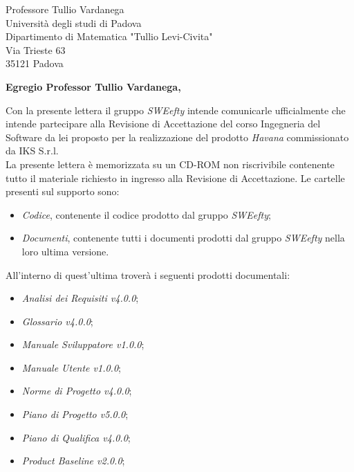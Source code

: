 \documentclass[12pt]{letter} %
\begin{document}
\begin{letter}{Professore Tullio Vardanega \\ Università degli studi di Padova \\ Dipartimento di Matematica "Tullio Levi-Civita" \\ Via Trieste 63 \\ 35121 Padova}
\opening{\textbf{Egregio Professor Tullio Vardanega,}}
\begin{addmargin}[2em]{2em}
  \hspace{1cm} Con la presente lettera il gruppo \emph{SWEefty} intende comunicarle ufficialmente che intende partecipare alla Revisione di Accettazione del corso Ingegneria del Software da lei proposto per la realizzazione del prodotto \emph{Havana} commissionato da IKS S.r.l.\\
  La presente lettera è memorizzata su un CD-ROM non riscrivibile contenente tutto il materiale richiesto in ingresso alla Revisione di Accettazione. Le cartelle presenti sul supporto sono:
  	\begin{itemize}
		\item \emph{Codice}, contenente il codice prodotto dal gruppo \emph{SWEefty};
		\item \emph{Documenti}, contenente tutti i documenti prodotti dal gruppo \emph{SWEefty} nella loro ultima versione.
	\end{itemize}
  All'interno di quest'ultima troverà i seguenti prodotti documentali:
      \begin{itemize}
      \item \emph{Analisi dei Requisiti v4.0.0};
      \item \emph{Glossario v4.0.0};
      \item \emph{Manuale Sviluppatore v1.0.0};
      \item \emph{Manuale Utente v1.0.0};
      \item \emph{Norme di Progetto v4.0.0};
      \item \emph{Piano di Progetto v5.0.0};
      \item \emph{Piano di Qualifica v4.0.0};
      \item \emph{Product Baseline v2.0.0};


\end{itemize}
\end{addmargin}
\end{letter}
\end{document}
